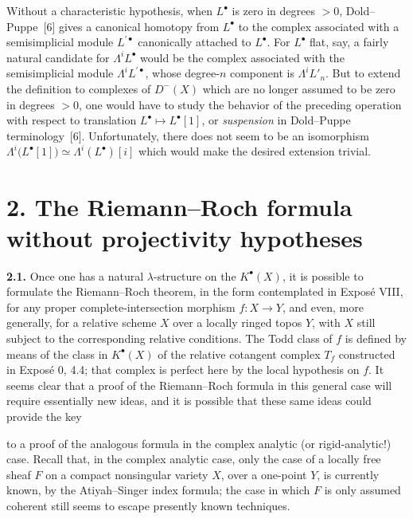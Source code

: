 Without a characteristic hypothesis, when $L^\bullet$ is zero in degrees $>0$, Dold--Puppe~[6] gives a canonical homotopy from $L^\bullet$ to the complex associated with a semisimplicial module $L^{\prime\bullet}$ canonically attached to $L^\bullet$. For $L^\bullet$ flat, say, a fairly natural candidate for $\Lambda^iL^\bullet$ would be the complex associated with the semisimplicial module $\Lambda^iL^{\prime\bullet}$, whose degree-$n$ component is $\Lambda^iL'_n$. But to extend the definition to complexes of $D^-(X)$ which are no longer assumed to be zero in degrees $>0$, one would have to study the behavior of the preceding operation with respect to translation $L^\bullet\mapsto L^\bullet[1]$, or \emph{suspension} in Dold--Puppe terminology~[6]. Unfortunately, there does not seem to be an isomorphism $\Lambda^i\bigl(L^\bullet[1]\bigr)\simeq\Lambda^i(L^\bullet)[i]$ which would make the desired extension trivial.

\section*{2. The Riemann--Roch formula without projectivity hypotheses}

\textbf{2.1.} Once one has a natural $\lambda$-structure on the $K^\bullet(X)$, it is possible to formulate the Riemann--Roch theorem, in the form contemplated in Expos\'e VIII, for any proper complete-intersection morphism $f:X\to Y$, and even, more generally, for a relative scheme $X$ over a locally ringed topos $Y$, with $X$ still subject to the corresponding relative conditions. The Todd class of $f$ is defined by means of the class in $K^\bullet(X)$ of the relative cotangent complex $T_f$ constructed in Expos\'e 0, 4.4; that complex is perfect here by the local hypothesis on $f$. It seems clear that a proof of the Riemann--Roch formula in this general case will require essentially new ideas, and it is possible that these same ideas could provide the key

to a proof of the analogous formula in the complex analytic (or rigid-analytic!) case. Recall that, in the complex analytic case, only the case of a locally free sheaf $F$ on a compact nonsingular variety $X$, over a one-point $Y$, is currently known, by the Atiyah--Singer index formula; the case in which $F$ is only assumed coherent still seems to escape presently known techniques.

